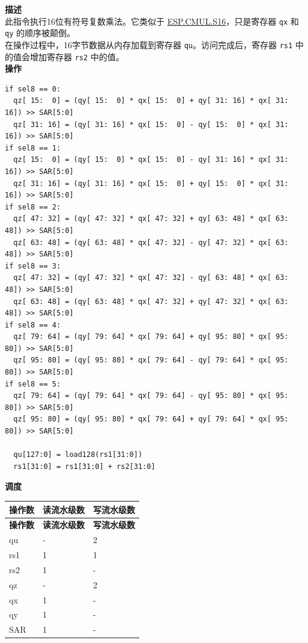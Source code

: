 \textbf{描述}\\
此指令执行16位有符号复数乘法。它类似于 \hyperref[instruction:ESPCMULS16]{ESP.CMUL.S16}，只是寄存器 \lstinline{qx} 和 \lstinline{qy} 的顺序被颠倒。\\
在操作过程中，16字节数据从内存加载到寄存器 \lstinline{qu}。访问完成后，寄存器 \lstinline{rs1} 中的值会增加寄存器 \lstinline{rs2} 中的值。\\
\textbf{操作}
\begin{lstlisting}
if sel8 == 0:
  qz[ 15:  0] = (qy[ 15:  0] * qx[ 15:  0] + qy[ 31: 16] * qx[ 31: 16]) >> SAR[5:0]
  qz[ 31: 16] = (qy[ 31: 16] * qx[ 15:  0] - qy[ 15:  0] * qx[ 31: 16]) >> SAR[5:0]
if sel8 == 1:
  qz[ 15:  0] = (qy[ 15:  0] * qx[ 15:  0] - qy[ 31: 16] * qx[ 31: 16]) >> SAR[5:0]
  qz[ 31: 16] = (qy[ 31: 16] * qx[ 15:  0] + qy[ 15:  0] * qx[ 31: 16]) >> SAR[5:0]
if sel8 == 2:
  qz[ 47: 32] = (qy[ 47: 32] * qx[ 47: 32] + qy[ 63: 48] * qx[ 63: 48]) >> SAR[5:0]
  qz[ 63: 48] = (qy[ 63: 48] * qx[ 47: 32] - qy[ 47: 32] * qx[ 63: 48]) >> SAR[5:0]
if sel8 == 3:
  qz[ 47: 32] = (qy[ 47: 32] * qx[ 47: 32] - qy[ 63: 48] * qx[ 63: 48]) >> SAR[5:0]
  qz[ 63: 48] = (qy[ 63: 48] * qx[ 47: 32] + qy[ 47: 32] * qx[ 63: 48]) >> SAR[5:0]
if sel8 == 4:
  qz[ 79: 64] = (qy[ 79: 64] * qx[ 79: 64] + qy[ 95: 80] * qx[ 95: 80]) >> SAR[5:0]
  qz[ 95: 80] = (qy[ 95: 80] * qx[ 79: 64] - qy[ 79: 64] * qx[ 95: 80]) >> SAR[5:0]
if sel8 == 5:
  qz[ 79: 64] = (qy[ 79: 64] * qx[ 79: 64] - qy[ 95: 80] * qx[ 95: 80]) >> SAR[5:0]
  qz[ 95: 80] = (qy[ 95: 80] * qx[ 79: 64] + qy[ 79: 64] * qx[ 95: 80]) >> SAR[5:0]

  qu[127:0] = load128(rs1[31:0])
  rs1[31:0] = rs1[31:0] + rs2[31:0]
\end{lstlisting}

\textbf{调度}\\
\begin{longtable}[c]{|l|l|l|}
    \hline
    \rowcolor{lightgray}
    \textbf{操作数} & \textbf{读流水级数} & \textbf{写流水级数} \\\hline
    \endfirsthead
    \hline
    \rowcolor{lightgray}
     \textbf{操作数} & \textbf{读流水级数} & \textbf{写流水级数} \\\hline
    \endhead
    \hline
    \endfoot

  qu & - & 2 \\\hline
  rs1 & 1 & 1 \\\hline
  rs2 & 1 & - \\\hline
  qz & - & 2 \\\hline
  qx & 1 & - \\\hline
  qy & 1 & - \\\hline
  SAR & 1 & -

\end{longtable}

